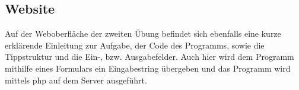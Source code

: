 \subsection{Website}
Auf der Weboberfläche der zweiten Übung befindet sich ebenfalls eine kurze erklärende Einleitung zur Aufgabe, der Code des Programms, sowie die Tippstruktur und die Ein-, bzw. Ausgabefelder. Auch hier wird dem Programm mithilfe eines Formulars ein Eingabestring übergeben und das Programm wird mittels php auf dem Server ausgeführt.